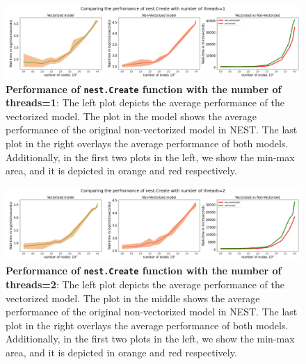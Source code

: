 \begin{figure}[ht!]
    \centering
    \includegraphics[width=\textwidth]{src/pic/thread_1.png}
    \caption{\textbf{Performance of \texttt{nest.Create} function with the number of threads=1}: The left plot depicts the average performance of the vectorized model. The plot in the model shows the average performance of the original non-vectorized model in NEST. The last plot in the right overlays the average performance of both models. Additionally, in the first two plots in the left, we show the min-max area, and it is depicted in orange and red respectively.}
    \label{fig:threads_1}
\end{figure}
\begin{figure}[ht!]
    \centering
    \includegraphics[width=\textwidth]{src/pic/thread_2.png}
    \caption{\textbf{Performance of \texttt{nest.Create} function with the number of threads=2}: The left plot depicts the average performance of the vectorized model. The plot in the middle shows the average performance of the original non-vectorized model in NEST. The last plot in the right overlays the average performance of both models. Additionally, in the first two plots in the left, we show the min-max area, and it is depicted in orange and red respectively.}
    \label{fig:threads_2}
\end{figure}

